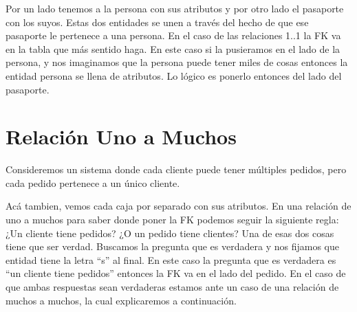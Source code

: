 \documentclass[12pt]{article}
\begin{document}
Por un lado tenemos a la persona con sus atributos y por otro lado el pasaporte con los suyos. Estas dos entidades se unen a través del hecho de que ese pasaporte le pertenece a una persona. En el caso de las relaciones 1..1 la FK va en la tabla que más sentido haga. En este caso si la pusieramos en el lado de la persona, y nos imaginamos que la persona puede tener miles de cosas entonces la entidad persona se llena de atributos. Lo lógico es ponerlo entonces del lado del pasaporte.

\section{Relación Uno a Muchos}
Consideremos un sistema donde cada cliente puede tener múltiples pedidos, pero cada pedido pertenece a un único cliente.

\begin{center}
\end{center}

Acá tambien, vemos cada caja por separado con sus atributos. En una relación de uno a muchos para saber donde poner la FK podemos seguir la siguiente regla: ¿Un cliente tiene pedidos? ¿O un pedido tiene clientes? Una de esas dos cosas tiene que ser verdad. Buscamos la pregunta que es verdadera y nos fijamos que entidad tiene la letra ``s'' al final. En este caso la pregunta que es verdadera es ``un cliente tiene pedidos'' entonces la FK va en el lado del pedido. En el caso de que ambas respuestas sean verdaderas estamos ante un caso de una relación de muchos a muchos, la cual explicaremos a continuación.
\end{document}
